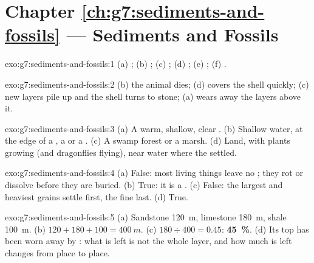 \section*{Chapter \ref{ch:g7:sediments-and-fossils} --- Sediments and Fossils}

\begin{solution}{exo:g7:sediments-and-fossils:1}
(a) ; (b) ; (c) ; (d) ; (e) ; (f)
.
\end{solution}

\begin{solution}{exo:g7:sediments-and-fossils:2}
(b) the animal dies; (d)  covers the shell quickly; (c) new layers
pile up and the shell turns to stone; (a)  wears away the layers
above it.
\end{solution}

\begin{solution}{exo:g7:sediments-and-fossils:3}
(a) A warm, shallow, clear . (b) Shallow water, at the edge of a
, a  or a . (c) A swamp forest or a marsh. (d) Land, with
plants growing (and dragonflies flying), near water where the 
settled.
\end{solution}

\begin{solution}{exo:g7:sediments-and-fossils:4}
(a) False: most living things leave no ; they rot or dissolve
before they are buried. (b) True: it is a . (c) False: the
largest and heaviest grains settle first, the fine  last. (d) True.
\end{solution}

\begin{solution}{exo:g7:sediments-and-fossils:5}
(a) Sandstone \qty{120}{m}, limestone \qty{180}{m}, shale \qty{100}{m}.
(b) $120 + 180 + 100 = \qty{400}{m}$. (c) $180 \div 400 = 0.45$:
\textbf{45~\%}. (d) Its top has been worn away by : what is left
is not the whole layer, and how much is left changes from place to place.
\end{solution}

